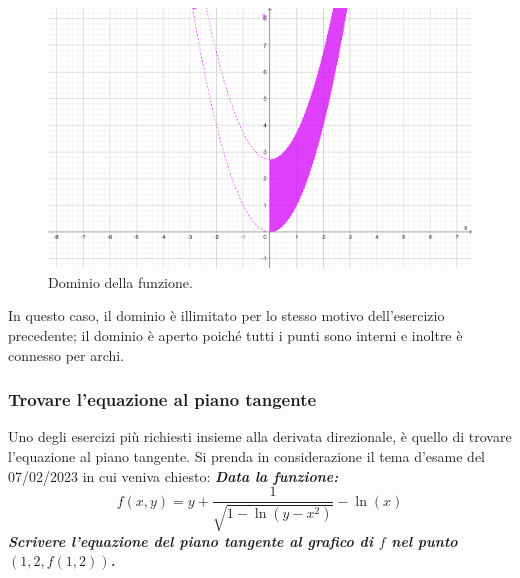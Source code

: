 \documentclass[a4paper]{article}
\begin{document}
	\begin{figure}[!htp]
		\centering
		\includegraphics[width=.8\textwidth]{img/grafico-ex3-5.pdf}
		\caption*{Dominio della funzione.}
	\end{figure}

	\noindent
	In questo caso, il dominio è illimitato per lo stesso motivo dell'esercizio precedente; il dominio è aperto poiché tutti i punti sono interni e inoltre è connesso per archi.\newpage

	\subsubsection{Trovare l'equazione al piano tangente}\label{par: trovare l'equazione al piano tangente}

	Uno degli esercizi più richiesti insieme alla derivata direzionale, è quello di trovare l'equazione al piano tangente. Si prenda in considerazione il tema d'esame del 07/02/2023 in cui veniva chiesto: \textcolor{Green4}{\textbf{\emph{Data la funzione:}}
	\begin{equation*}
		f\left(x,y\right) = y + \dfrac{1}{\sqrt{1 - \ln\left(y - x^{2}\right)}} - \ln\left(x\right)
	\end{equation*}
	\textbf{\emph{Scrivere l'equazione del piano tangente al grafico di $f$ nel punto $\left(1, 2, f\left(1,2\right)\right)$.}}}\newline
\end{document}
